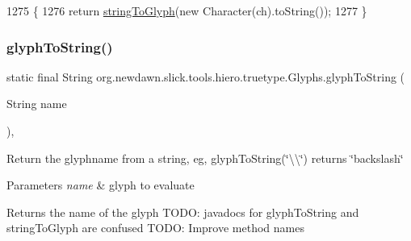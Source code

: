 \begin{DoxyCode}
1275                                                         \{
1276         \textcolor{keywordflow}{return} \mbox{\hyperlink{classorg_1_1newdawn_1_1slick_1_1tools_1_1hiero_1_1truetype_1_1_glyphs_a50508eacea49c4be9778f84d28b186d4}{stringToGlyph}}(\textcolor{keyword}{new} Character(ch).toString());
1277     \}
\end{DoxyCode}
\mbox{\label{classorg_1_1newdawn_1_1slick_1_1tools_1_1hiero_1_1truetype_1_1_glyphs_a7e4b4c2e0649fbf355ea6f7addf96dba}} 
\subsubsection{\texorpdfstring{glyph\+To\+String()}{glyphToString()}}
{\footnotesize\ttfamily static final String org.\+newdawn.\+slick.\+tools.\+hiero.\+truetype.\+Glyphs.\+glyph\+To\+String (\begin{DoxyParamCaption}\item[{String}]{name }\end{DoxyParamCaption})\hspace{0.3cm}{\ttfamily [inline]}, {\ttfamily [static]}}

Return the glyphname from a string, eg, glyph\+To\+String(\char`\"{}\textbackslash{}\textbackslash{}\char`\"{}) returns \char`\"{}backslash\char`\"{}


\begin{DoxyParams}{Parameters}
{\em name} & glyph to evaluate \\
\hline
\end{DoxyParams}
\begin{DoxyReturn}{Returns}
the name of the glyph T\+O\+DO\+: javadocs for glyph\+To\+String and string\+To\+Glyph are confused T\+O\+DO\+: Improve method names 
\end{DoxyReturn}


